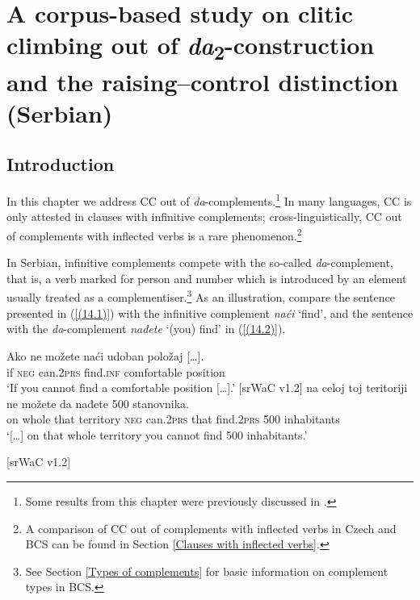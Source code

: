 \chapter[A corpus-based study on clitic climbing out of \textit{da}\textsubscript{2}-construction]
        {A corpus-based study on clitic climbing out of \textit{da}\textsubscript{2}-construction and the raising--control distinction (Serbian)}
\label{A corpus-based study on CC in da constructions and the raising-control distinction (Serbian)}
\section{Introduction}

In this chapter we address CC out of \textit{da}-complements.\footnote{Some results from this chapter were previously discussed in  \citet*{JHK17a}.} In many languages, CC is only attested in clauses with infinitive complements; cross-linguistically, CC out of complements with inflected verbs is a rare phenomenon.\footnote{A comparison of CC out of complements with inflected verbs in Czech and BCS can be found in Section \ref{Clauses with inflected verbs}.} %

In Serbian, infinitive complements compete with the so-called \textit{da}-complement, that is, a verb marked for person and number which is introduced by an element usually treated as a complementiser.\footnote{See Section \ref{Types of complements} for basic information on complement types in BCS.}  As an illustration, compare the sentence presented in (\ref{(14.1)}) with the infinitive complement \textit{naći} ‘find’, and the sentence with the \textit{da}-complement \textit{nađete} `(you) find' in (\ref{(14.2)}).

\begin{exe}\ex\label{(14.1)}
\gll Ako ne možete naći udoban {položaj [\dots].} \\
if \textsc{neg} can.\textsc{2prs} find.\textsc{inf} comfortable position \\
\glt ‘If you cannot find a comfortable position [\dots].’
\hfill [srWaC v1.2]
\ex\label{(14.2)}
\gll [\dots]  na celoj toj teritoriji ne možete da nađete 500 stanovnika.  \\
{} on whole that territory \textsc{neg} can.\textsc{2prs} that find.\textsc{2prs} 500 inhabitants\\
\glt ‘[\dots] on that whole territory you cannot find 500 inhabitants.’ \\
\strut\hfill [srWaC v1.2]
\end{exe}

